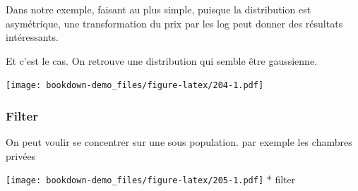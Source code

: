 \documentclass[
]{book}
\newenvironment{Shaded}{\begin{snugshade}}{\end{snugshade}}
\newcommand{\CommentTok}[1]{\textcolor[rgb]{0.56,0.35,0.01}{\textit{#1}}}
\newcommand{\DataTypeTok}[1]{\textcolor[rgb]{0.13,0.29,0.53}{#1}}
\newcommand{\KeywordTok}[1]{\textcolor[rgb]{0.13,0.29,0.53}{\textbf{#1}}}
\newcommand{\NormalTok}[1]{#1}
\newcommand{\OperatorTok}[1]{\textcolor[rgb]{0.81,0.36,0.00}{\textbf{#1}}}
\newcommand{\StringTok}[1]{\textcolor[rgb]{0.31,0.60,0.02}{#1}}
\begin{document}
Dans notre exemple, faisant au plus simple, puisque la distribution est asymétrique, une transformation du prix par les log peut donner des résultats intéressants.

Et c'est le cas. On retrouve une distribution qui semble être gaussienne.

\begin{Shaded}
\end{Shaded}

\texttt{[image: bookdown-demo\_files/figure-latex/204-1.pdf]}

\hypertarget{filter}{%
\subsubsection{Filter}\label{filter}}

On peut voulir se concentrer sur une sous population. par exemple les chambres privées

\begin{Shaded}
\end{Shaded}

\texttt{[image: bookdown-demo\_files/figure-latex/205-1.pdf]}
* filter
\end{document}
